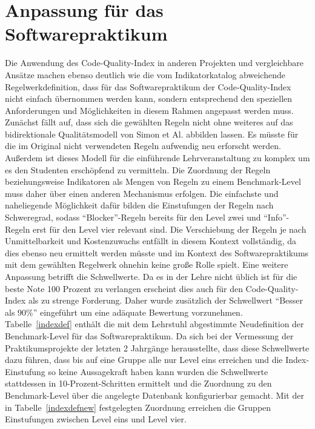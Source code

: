 \documentclass[da,ngerman]{stthesis}
\begin{document}
		\section{Anpassung für das Softwarepraktikum}
			Die Anwendung des Code-Quality-Index in anderen Projekten und vergleichbare Ansätze machen ebenso deutlich wie die vom Indikatorkatalog abweichende Regelwerkdefinition, dass für das Softwarepraktikum der Code-Quality-Index nicht einfach übernommen werden kann, sondern entsprechend den speziellen Anforderungen und Möglichkeiten in diesem Rahmen angepasst werden muss. \newline
			Zunächst fällt auf, dass sich die gewählten Regeln nicht ohne weiteres auf das bidirektionale Qualitätsmodell von Simon et Al. abbilden lassen. Es müsste für die im Original nicht verwendeten Regeln aufwendig neu erforscht werden. Außerdem ist dieses Modell für die einführende Lehrveranstaltung zu komplex um es den Studenten erschöpfend zu vermitteln. Die Zuordnung der Regeln beziehungsweise Indikatoren als Mengen von Regeln zu einem Benchmark-Level muss daher über einen anderen Mechanismus erfolgen. Die einfachste und naheliegende Möglichkeit dafür bilden die Einstufungen der Regeln nach Schweregrad, sodass "`Blocker"'-Regeln bereits für den Level zwei und "`Info"'-Regeln erst für den Level vier relevant sind. Die Verschiebung der Regeln je nach Unmittelbarkeit und Kostenzuwachs entfällt in diesem Kontext vollständig, da dies ebenso neu ermittelt werden müsste und im Kontext des Softwarepraktikums mit dem gewählten Regelwerk ohnehin keine große Rolle spielt. \newline
			Eine weitere Anpassung betrifft die Schwellwerte. Da es in der Lehre nicht üblich ist für die beste Note 100 Prozent zu verlangen erscheint dies auch für den Code-Quality-Index als zu strenge Forderung. Daher wurde zusätzlich der Schwellwert "`Besser als 90\%"' eingeführt um eine adäquate Bewertung vorzunehmen. Tabelle~\ref{indexdef} enthält die mit dem Lehrstuhl abgestimmte Neudefinition der Benchmark-Level für das Softwarepraktikum. Da sich bei der Vermessung der Praktikumsprojekte der letzten 2 Jahrgänge herausstellte, dass diese Schwellwerte dazu führen, dass bis auf eine Gruppe alle nur Level eins erreichen und die Index-Einstufung so keine Aussagekraft haben kann wurden die Schwellwerte stattdessen in 10-Prozent-Schritten ermittelt und die Zuordnung zu den Benchmark-Level über die angelegte Datenbank konfigurierbar gemacht. Mit der in Tabelle~\ref{indexdefnew} festgelegten Zuordnung erreichen die Gruppen Einstufungen zwischen Level eins und Level vier. \newline 
\end{document}
